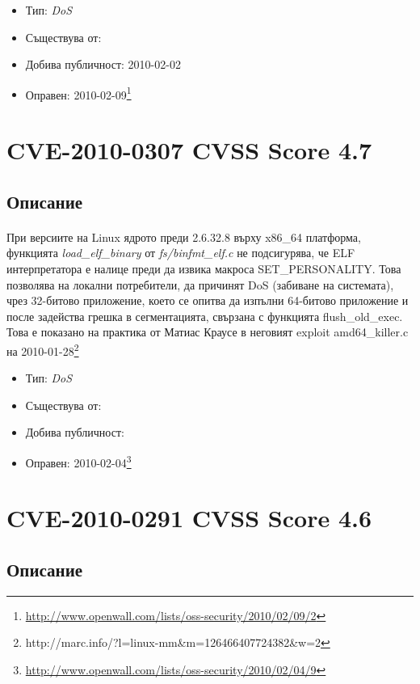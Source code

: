 \documentclass[a4paper,12pt,leqno]{article}
\begin{document}
\begin{itemize}
    \item Тип: \textit{DoS}
    \item Съществува от:
  	\item Добива публичност: 2010-02-02
    \item Оправен: 2010-02-09\footnote{\url{http://www.openwall.com/lists/oss-security/2010/02/09/2}}
\end{itemize}

\section{CVE-2010-0307 CVSS Score 4.7}
\subsection{Описание}
\paragraph{}
При версиите на Linux ядрото преди 2.6.32.8 върху x86\_64 платформа, 
функцията \textit{load\_elf\_binary} от \textit{fs/binfmt\_elf.c} не подсигурява, че ELF 
интерпретатора е налице преди да извика макроса SET\_PERSONALITY. Това 
позволява на локални потребители, да причинят DoS (забиване на системата), 
чрез 32-битово приложение, което се опитва да изпълни 64-битово 
приложение и после задейства грешка в сегментацията, свързана с 
функцията flush\_old\_exec. Това е показано на практика от Матиас Краусе в 
неговият exploit amd64\_killer.c на 2010-01-28\footnote{http://marc.info/?l=linux-mm&m=126466407724382&w=2}


\begin{itemize}
    \item Тип: \textit{DoS}
    \item Съществува от:
  	\item Добива публичност: 
    \item Оправен: 2010-02-04\footnote{\url{ http://www.openwall.com/lists/oss-security/2010/02/04/9}}
\end{itemize}


\section{CVE-2010-0291 CVSS Score 4.6}
\subsection{Описание}
\end{document}
